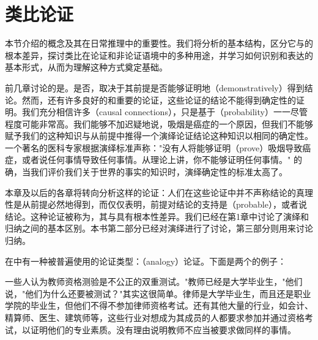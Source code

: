 \section{类比论证}

\begin{logicbox}[title=引言]
本节介绍的概念及其在日常推理中的重要性。我们将分析的基本结构，区分它与的根本差异，探讨类比在论证和非论证语境中的多种用途，并学习如何识别和表达的基本形式，从而为理解这种方式奠定基础。
\end{logicbox}

前几章讨论的是。是否，取决于其前提是否能够证明地（demonstratively）得到结论。然而，还有许多良好的和重要的论证，这些论证的结论不能得到确定性的证明。我们充分相信许多（causal connections），只是基于（probability）一一尽管程度可能非常高。我们能够不加迟疑地说，吸烟是癌症的一个原因，但我们不能够赋予我们的这种知识与从前提中推得一个演绎论证结论这种知识以相同的确定性。一个著名的医科专家根据演绎标准声称："没有人将能够证明（prove）吸烟导致癌症，或者说任何事情导致任何事情。从理论上讲，你不能够证明任何事情。"\cite{surgeon1964} 的确，当我们评价我们关于世界的事实的知识时，演绎确定性的标准太高了。

\begin{theorembox}[title=归纳论证与演绎论证的区别]
本章及以后的各章将转向分析这样的论证：人们在这些论证中并不声称结论的真理性是从前提必然地得到，而仅仅表明，前提对结论的支持是（probable），或者说结论。这种论证被称为，其与具有根本性差异。我们已经在第1章中讨论了演绎和归纳之间的基本区别。本书第二部分已经对演绎进行了讨论，第三部分则用来讨论归纳。
\end{theorembox}

在中有一种被普遍使用的论证类型：（analogy）论证。下面是两个的例子：

\begin{examplebox}[title=类比论证实例一：教师资格测验]
一些人认为教师资格测验是不公正的双重测试。"教师已经是大学毕业生，"他们说，"他们为什么还要被测试？"其实这很简单。律师是大学毕业生，而且还是职业学院的毕业生，但他们不得不参加律师资格考试。还有其他大量的行业，如会计、精算师、医生、建筑师等，这些行业对想成为其成员的人都要求参加并通过资格考试，以证明他们的专业素质。没有理由说明教师不应当被要求做同样的事情。\cite{davis1986}
\end{examplebox}

